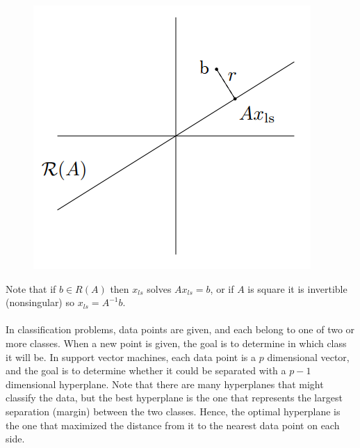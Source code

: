 \documentclass[12pt]{article}
\begin{document}
\begin{figure}[H]
\centering
\includegraphics[scale=0.7]{ls.PNG}
\end{figure}
Note that if $b\in R(A)$ then $x_{ls}$ solves $Ax_{ls}=b$, or if $A$ is square it is invertible (nonsingular) so $x_{ls}=A^{-1}b$.\\
\\In classification problems, data points are given, and each belong to one of two or more classes. When a new point is given, the goal is to determine in which class it will be.
In support vector machines, each data point is a $p$ dimensional vector, and the goal is to determine whether it could be separated with a $p-1$ dimensional hyperplane.
Note that there are many hyperplanes that might classify the data, but the best hyperplane is the one that represents the largest separation (margin) between the two classes. Hence, the optimal hyperplane is the one that maximized the distance from it to the nearest data point on each side. 
\newpage
\end{document}
